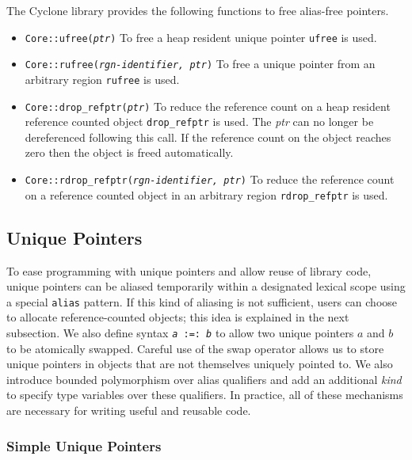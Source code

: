 The Cyclone library provides the following functions to free
alias-free pointers.

\begin{itemize}
\item \texttt{Core::ufree({\it ptr})}
  To free a heap resident unique pointer {\tt ufree} is used. 

\item \texttt{Core::rufree({\it rgn-identifier, ptr})} To free a
unique pointer from an arbitrary region {\tt rufree} is used. 

\item \texttt{Core::drop\_refptr({\it ptr})}
To reduce the reference count on a heap resident reference counted
object {\tt drop\_refptr} is used. The {\it ptr} can no longer be
dereferenced following this call. If the reference count on the object
reaches zero then the object is freed automatically.

\item \texttt{Core::rdrop\_refptr({\it rgn-identifier, ptr})} To reduce
the reference count on a reference counted object in an arbitrary
region {\tt rdrop\_refptr} is used.

\end{itemize}

\subsection{Unique Pointers}

To ease programming with unique pointers and allow reuse of library
code, unique pointers can be aliased temporarily within a designated
lexical scope using a special \texttt{alias} pattern.  If this kind of
aliasing is not sufficient, users can choose to allocate
reference-counted objects; this idea is explained in the next
subsection.  We also define syntax \texttt{{\it a} :=: {\it b}} to
allow two unique pointers $a$ and $b$ to be atomically swapped.
Careful use of the swap operator allows us to store unique pointers in
objects that are not themselves uniquely pointed to.  We also
introduce bounded polymorphism over alias qualifiers and add an
additional \emph{kind} to specify type variables over these
qualifiers. In practice, all of these mechanisms are necessary for
writing useful and reusable code.

\subsubsection{Simple Unique Pointers}

